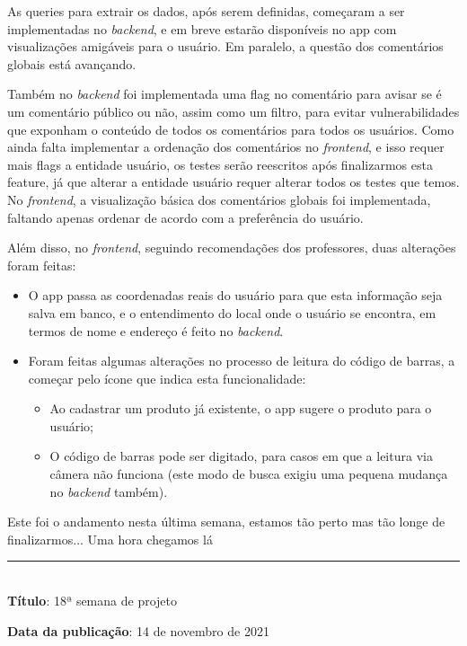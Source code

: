 As queries para extrair os dados, após serem definidas, começaram a ser implementadas no \textit{\gls{backend}}, e em breve estarão disponíveis no app com visualizações amigáveis para o usuário. Em paralelo, a questão dos comentários globais está avançando. 

Também no \textit{\gls{backend}} foi implementada uma flag no comentário para avisar se é um comentário público ou não, assim como um filtro, para evitar vulnerabilidades que exponham o conteúdo de todos os comentários para todos os usuários. Como ainda falta implementar a ordenação dos comentários no \textit{\gls{frontend}}, e isso requer mais flags a entidade usuário, os testes serão reescritos após finalizarmos esta feature, já que alterar a entidade usuário requer alterar todos os testes que temos. No \textit{\gls{frontend}}, a visualização básica dos comentários globais foi implementada, faltando apenas ordenar de acordo com a preferência do usuário.

Além disso, no \textit{\gls{frontend}}, seguindo recomendações dos professores, duas alterações foram feitas:

\begin{itemize}
	\item O app passa as coordenadas reais do usuário para que esta informação seja salva em banco, e o entendimento do local onde o usuário se encontra, em termos de nome e endereço é feito no \textit{\gls{backend}}.
	\item Foram feitas algumas alterações no processo de leitura do código de barras, a começar pelo ícone que indica esta funcionalidade:
		\begin{itemize}
		\item Ao cadastrar um produto já existente, o app sugere o produto para o usuário;
		\item O código de barras pode ser digitado, para casos em que a leitura via câmera não funciona (este modo de busca exigiu uma pequena mudança no \textit{\gls{backend}} também).
		\end{itemize}
\end{itemize} 

Este foi o andamento nesta última semana, estamos tão perto mas tão longe de finalizarmos... Uma hora chegamos lá \\

\protect\rule{13cm}{.5pt}
\\

\textbf{Título}: 18ª semana de projeto

\textbf{Data da publicação}: 14 de novembro de 2021

